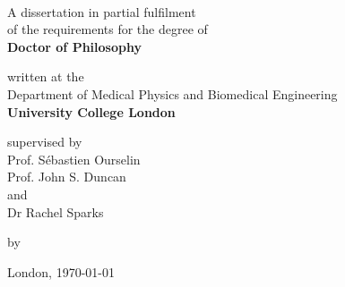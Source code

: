 \thispagestyle{empty}
\begin{titlepage}
\addtolength{\wpXoffset}{-21cm}
\addtolength{\wpYoffset}{13.5cm}
%
	\begin{center}
		\vspace*{2.5cm}

		\LARGE{\bfseries \thetitle}\\%
		\vspace*{1cm}

		\normalsize{A dissertation in partial fulfilment}\\%
		\vspace*{0.2cm}
		\normalsize{of the requirements for the degree of}\\%
		\vspace*{0.2cm}
		\large{\bfseries Doctor of Philosophy}%
		\vfill

		\normalsize{written at the}\\%
		\vspace*{0.2cm}
		\large{Department of Medical Physics and Biomedical Engineering}\\%
		\vspace*{0.2cm}
		\large{\bfseries University College London}\\
		\vfill

		\normalsize{supervised by}\\
		\vspace*{0.2cm}
		\large{Prof. Sébastien Ourselin}\\
		\vspace*{0.2cm}
		\large{Prof. John S. Duncan}\\
		\vspace*{0.2cm}
		\normalsize{and}\\
		\vspace*{0.2cm}
		\large{Dr Rachel Sparks}\\
		\vfill

		\normalsize{by}\\%
		\large{\textit{\theauthor}}

		\vfill
	\noindent London, \today
	\end{center}

\end{titlepage}
